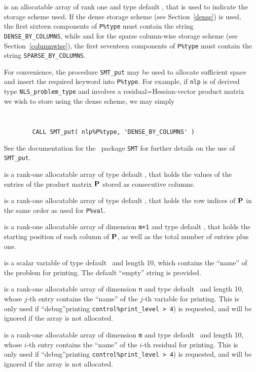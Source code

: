 \documentclass{galahad}
\newcommand{\packagename}{NLS}
\begin{document}
\begin{description}
\begin{description}

 is an allocatable array of rank one and type default
\character, that
is used to indicate the storage scheme used. If the dense storage scheme
(see Section~\ref{dense}) is used,
the first sixteen components of {\tt P\%type} must contain the
string {\tt DENSE\_BY\_COLUMNS}, while
and for the sparse column-wise storage scheme (see Section~\ref{columnwise}),
the first seventeen components of {\tt P\%type} must contain the
string {\tt SPARSE\_BY\_COLUMNS}.

For convenience, the procedure {\tt SMT\_put}
may be used to allocate sufficient space and insert the required keyword
into {\tt P\%type}.
For example, if {\tt nlp} is of derived type {\tt \packagename\_problem\_type}
and involves a residual=Hessian-vector product matrix we wish to store
using the dense scheme,
we may simply
{\tt
\begin{verbatim}
        CALL SMT_put( nlp%P%type, 'DENSE_BY_COLUMNS' )
\end{verbatim}
}
\noindent
See the documentation for the \galahad\ package {\tt SMT}
for further details on the use of {\tt SMT\_put}.

 is a rank-one allocatable array of type default \realdp,
that holds the values of the entries of the product matrix ${\mathbf{P}}$ stored
as consecutive columns.

 is a rank-one allocatable array of type default \integer,
that holds the row indices of ${\mathbf{P}}$ in the same order as used for
{\tt P\%val}.

 is a rank-one allocatable array of dimension {\tt m+1}
and type default \integer, that holds the starting position of
each column of ${\mathbf{P}}$, as well as the total number of entries plus one.

\end{description}

 is a scalar variable of type
default \character\ and length 10, which contains the
``name'' of the problem for printing. The default ``empty'' string is
provided.

 is a rank-one allocatable array of dimension {\tt n} and type
default \character\ and length 10, whose $j$-th entry contains the
``name'' of the $j$-th variable for printing. This is only used
if ``debug''printing {\tt control\%print\_level > 4}) is requested,
and will be ignored if the array is not allocated.

 is a rank-one allocatable array of dimension {\tt m} and type
default \character\ and length 10, whose $i$-th entry contains the
``name'' of the $i$-th residual for printing. This is only used
if ``debug''printing {\tt control\%print\_level > 4}) is requested,
and will be ignored if the array is not allocated.

\end{description}
\end{document}
